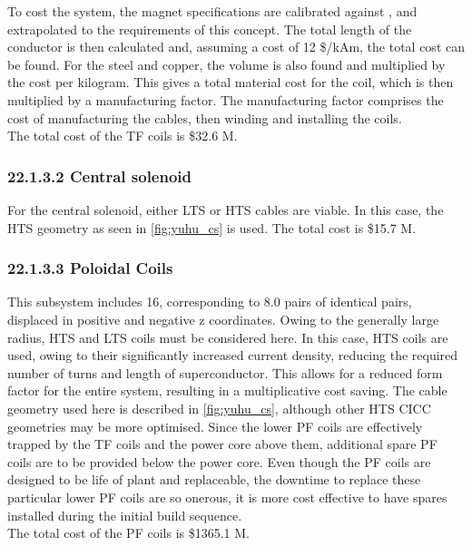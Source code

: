 To cost the system, the magnet specifications are calibrated against \cite{Menard2016}, and extrapolated to the requirements of this concept. The total length of the conductor is then calculated and, assuming a cost of 12 \$/kAm, the total cost can be found. For the steel and copper, the volume is also found and multiplied by the cost per kilogram. This gives a total material cost for the coil, which is then multiplied by a manufacturing factor. The manufacturing factor comprises the cost of manufacturing the cables, then winding and installing the coils. \\

The total cost of the TF coils is \$32.6 M.

\subsubsection*{22.1.3.2 Central solenoid}

For the central solenoid, either LTS or HTS cables are viable. In this case, the HTS geometry as seen in \ref{fig:yuhu_cs} is used. The total cost is \$15.7 M.

\subsubsection*{22.1.3.3 Poloidal Coils}

This subsystem includes 16, corresponding to 8.0 pairs of identical pairs, displaced in positive and negative z coordinates. Owing to the generally large radius, HTS and LTS coils must be considered here. In this case, HTS coils are used, owing to their significantly increased current density, reducing the required number of turns and length of superconductor. This allows for a reduced form factor for the entire system, resulting in a multiplicative cost saving. The cable geometry used here is described in \ref{fig:yuhu_cs}, although other HTS CICC geometries may be more optimised.
Since the lower PF coils are effectively trapped by the TF coils and the power core above them, additional spare PF coils are to be provided below the power core. Even though the PF coils are designed to be life of plant and replaceable, the downtime to replace these particular lower PF coils are so onerous, it is more cost effective to have spares installed during the initial build sequence.  \\

The total cost of the PF coils is \$1365.1 M. \\

